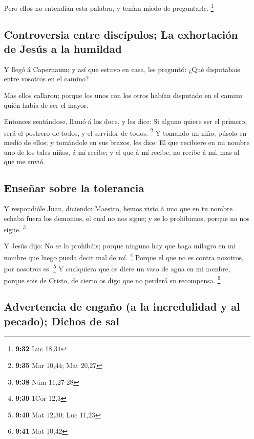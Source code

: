 Pero ellos no entendían esta palabra, y tenían miedo de
preguntarle. \footnote{\textbf{9:32} Luc 18,34}

\hypertarget{controversia-entre-discuxedpulos-la-exhortaciuxf3n-de-jesuxfas-a-la-humildad}{%
\subsection{Controversia entre discípulos; La exhortación de Jesús a la
humildad}\label{controversia-entre-discuxedpulos-la-exhortaciuxf3n-de-jesuxfas-a-la-humildad}}

 Y llegó á Capernaum; y así que estuvo en casa, les
preguntó: ¿Qué disputabais entre vosotros en el camino?

 Mas ellos callaron; porque los unos con los otros habían
disputado en el camino quién había de ser el mayor.

 Entonces sentándose, llamó á los doce, y les dice: Si
alguno quiere ser el primero, será el postrero de todos, y el servidor
de todos. \footnote{\textbf{9:35} Mar 10,44; Mat 20,27} 
Y tomando un niño, púsolo en medio de ellos; y tomándole en sus brazos,
les dice:  El que recibiere en mi nombre uno de los tales
niños, á mí recibe; y el que á mí recibe, no recibe á mí, mas al que me
envió.

\hypertarget{enseuxf1ar-sobre-la-tolerancia}{%
\subsection{Enseñar sobre la
tolerancia}\label{enseuxf1ar-sobre-la-tolerancia}}

 Y respondióle Juan, diciendo: Maestro, hemos visto á uno
que en tu nombre echaba fuera los demonios, el cual no nos sigue; y se
lo prohibimos, porque no nos sigue. \footnote{\textbf{9:38} Núm 11,27-28}

 Y Jesús dijo: No se lo prohibáis; porque ninguno hay que
haga milagro en mi nombre que luego pueda decir mal de mí. \footnote{\textbf{9:39}
  1Cor 12,3}  Porque el que no es contra nosotros, por
nosotros es. \footnote{\textbf{9:40} Mat 12,30; Luc 11,23}
 Y cualquiera que os diere un vaso de agua en mi nombre,
porque sois de Cristo, de cierto os digo que no perderá su recompensa.
\footnote{\textbf{9:41} Mat 10,42}

\hypertarget{advertencia-de-engauxf1o-a-la-incredulidad-y-al-pecado-dichos-de-sal}{%
\subsection{Advertencia de engaño (a la incredulidad y al pecado);
Dichos de
sal}\label{advertencia-de-engauxf1o-a-la-incredulidad-y-al-pecado-dichos-de-sal}}

